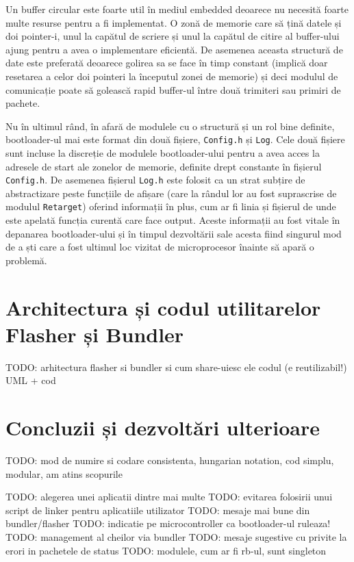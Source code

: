 \documentclass[12pt,a4paper,titlepage]{report}
\begin{document}
Un buffer circular este foarte util în mediul embedded deoarece nu necesită foarte multe resurse pentru a fi implementat. O zonă de memorie care să țină datele și doi pointer-i, unul la capătul de scriere și unul la capătul de citire al buffer-ului ajung pentru a avea o implementare eficientă. De asemenea aceasta structură de date este preferată deoarece golirea sa se face în timp constant (implică doar resetarea a celor doi pointeri la începutul zonei de memorie) și deci modulul de comunicație poate să golească rapid buffer-ul între două trimiteri sau primiri de pachete.

Nu în ultimul rând, în afară de modulele cu o structură și un rol bine definite, bootloader-ul mai este format din două fișiere, \texttt{Config.h} și \texttt{Log}. Cele două fișiere sunt incluse la discreție de modulele bootloader-ului pentru a avea acces la adresele de start ale zonelor de memorie, definite drept constante în fișierul \texttt{Config.h}. De asemenea fișierul \texttt{Log.h} este folosit ca un strat subțire de abstractizare peste funcțiile de afișare (care la rândul lor au fost suprascrise de modulul \texttt{Retarget}) oferind informații în plus, cum ar fi linia și fișierul de unde este apelată funcția curentă care face output. Aceste informații au fost vitale în depanarea bootloader-ului și în timpul dezvoltării sale acesta fiind singurul mod de a ști care a fost ultimul loc vizitat de microprocesor înainte să apară o problemă.

\section{Architectura și codul utilitarelor Flasher și Bundler}
TODO: arhitectura flasher si bundler si cum share-uiesc ele codul (e reutilizabil!) UML + cod

\section{Concluzii și dezvoltări ulterioare}
TODO: mod de numire si codare consistenta, hungarian notation, cod simplu, modular, am atins scopurile

TODO: alegerea unei aplicatii dintre mai multe
TODO: evitarea folosirii unui script de linker pentru aplicatiile utilizator
TODO: mesaje mai bune din bundler/flasher
TODO: indicatie pe microcontroller ca bootloader-ul ruleaza!
TODO: management al cheilor via bundler
TODO: mesaje sugestive cu privite la erori in pachetele de status
TODO: modulele, cum ar fi rb-ul, sunt singleton

\newpage


\end{document}
